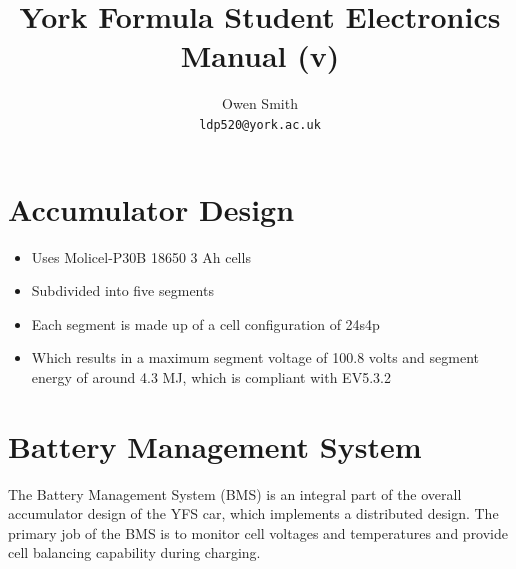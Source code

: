 \documentclass[12pt]{article}
\title{York Formula Student Electronics Manual (v\vhCurrentVersion)}
\date{\vhCurrentDate}
\author{
  Owen Smith\\
  \texttt{ldp520@york.ac.uk}
}
\begin{document}
\maketitle
\tableofcontents

\section{Accumulator Design}

\begin{itemize}
\item Uses Molicel-P30B 18650 3 Ah cells
\item Subdivided into five segments
\item Each segment is made up of a cell configuration of 24s4p
\item Which results in a maximum segment voltage of 100.8 volts and segment energy of around 4.3 MJ, which is compliant with EV5.3.2
\end{itemize}

\section{Battery Management System}
The Battery Management System (BMS) is an integral part of the overall accumulator design of the YFS car, which implements a distributed design.
The primary job of the BMS is to monitor cell voltages and temperatures and provide cell balancing capability during charging.
\end{document}
